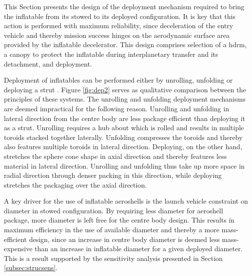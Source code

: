 This Section presents the design of the deployment mechanism required to bring the inflatable from its stowed to its deployed configuration. It is key that this action is performed with maximum reliability, since deceleration of the entry vehicle and thereby mission success hinges on the aerodynamic surface area provided by the inflatable decelerator. This design comprises selection of a \acrfull{hdrm}, a canopy to protect the inflatable during interplanetary transfer and its detachment, and deployment.

Deployment of inflatables can be performed either by unrolling, unfolding or deploying a strut \cite[p.222-227]{Jenkins2001}. Figure \ref{fig:dep2} serves as qualitative comparison between the principles of these systems. The unrolling and unfolding deployment mechanisms are deemed impractical for the following reason. Unrolling and unfolding in lateral direction from the centre body are less package efficient than deploying it as a strut. Unrolling requires a hub about which is rolled and results in multiple toroids stacked together laterally. Unfolding compresses the toroids and thereby also features multiple toroids in lateral direction. Deploying, on the other hand, stretches the sphere cone shape in axial direction and thereby features less material in lateral direction. Unrolling and unfolding thus take up more space in radial direction through denser packing in this direction, while deploying stretches the packaging over the axial direction. 

A key driver for the use of inflatable aeroshells is the launch vehicle constraint on diameter in stowed configuration. By requiring less diameter for aeroshell package, more diameter is left free for the centre body design. This results in maximum efficiency in the use of available diameter and thereby a more mass-efficient design, since an increase in centre body diameter is deemed less mass-expensive than an increase in inflatable diameter for a given deployed diameter. This is a result supported by the sensitivity analysis presented in Section \ref{subsec:strucsens}. 

